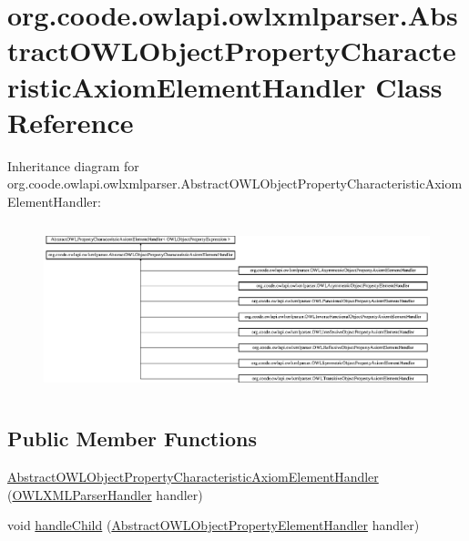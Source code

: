 \hypertarget{classorg_1_1coode_1_1owlapi_1_1owlxmlparser_1_1_abstract_o_w_l_object_property_characteristic_axiom_element_handler}{\section{org.\-coode.\-owlapi.\-owlxmlparser.\-Abstract\-O\-W\-L\-Object\-Property\-Characteristic\-Axiom\-Element\-Handler Class Reference}
\label{classorg_1_1coode_1_1owlapi_1_1owlxmlparser_1_1_abstract_o_w_l_object_property_characteristic_axiom_element_handler}
}
Inheritance diagram for org.\-coode.\-owlapi.\-owlxmlparser.\-Abstract\-O\-W\-L\-Object\-Property\-Characteristic\-Axiom\-Element\-Handler\-:\begin{figure}[H]
\begin{center}
\leavevmode
\includegraphics[height=4.973357cm]{classorg_1_1coode_1_1owlapi_1_1owlxmlparser_1_1_abstract_o_w_l_object_property_characteristic_axiom_element_handler}
\end{center}
\end{figure}
\subsection*{Public Member Functions}
\begin{DoxyCompactItemize}
\item 
\hyperlink{classorg_1_1coode_1_1owlapi_1_1owlxmlparser_1_1_abstract_o_w_l_object_property_characteristic_axiom_element_handler_aeed7fb51f13c45f3b90067d9655de2e9}{Abstract\-O\-W\-L\-Object\-Property\-Characteristic\-Axiom\-Element\-Handler} (\hyperlink{classorg_1_1coode_1_1owlapi_1_1owlxmlparser_1_1_o_w_l_x_m_l_parser_handler}{O\-W\-L\-X\-M\-L\-Parser\-Handler} handler)
\item 
void \hyperlink{classorg_1_1coode_1_1owlapi_1_1owlxmlparser_1_1_abstract_o_w_l_object_property_characteristic_axiom_element_handler_a17484c9f1783eab34889b96e3d168185}{handle\-Child} (\hyperlink{classorg_1_1coode_1_1owlapi_1_1owlxmlparser_1_1_abstract_o_w_l_object_property_element_handler}{Abstract\-O\-W\-L\-Object\-Property\-Element\-Handler} handler)
\end{DoxyCompactItemize}



